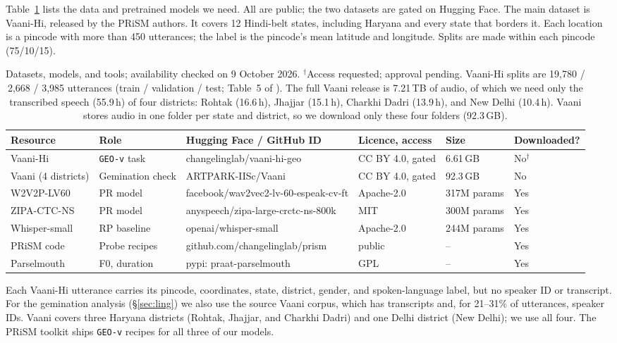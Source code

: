 \documentclass[11pt]{article}
\newcommand{\geov}{\texttt{GEO-v}}
\begin{document}
Table~\ref{tab:data} lists the data and pretrained models we need. All are public; the two datasets are gated on Hugging Face. The main dataset is Vaani-Hi, released by the PRiSM authors. It covers 12 Hindi-belt states, including Haryana and every state that borders it. Each location is a pincode with more than 450 utterances; the label is the pincode's mean latitude and longitude. Splits are made within each pincode (75/10/15).

\begin{table}[t]
\centering
\footnotesize
\setlength{\tabcolsep}{2.7pt}
\begin{tabular}{@{}ll>{\ttfamily\scriptsize}lll>{\centering\arraybackslash}p{1.15cm}@{}}
\toprule
\textbf{Resource} & \textbf{Role} & \normalfont\footnotesize\textbf{Hugging Face / GitHub ID} & \textbf{Licence, access} & \textbf{Size} & \textbf{Down\-loaded?} \\
\midrule
Vaani-Hi & \geov{} task & changelinglab/vaani-hi-geo & CC BY 4.0, gated & 6.61\,GB & No$^\dagger$ \\
Vaani (4 districts) & Gemination check & ARTPARK-IISc/Vaani & CC BY 4.0, gated & 92.3\,GB & No \\
W2V2P-LV60 & PR model & facebook/wav2vec2-lv-60-espeak-cv-ft & Apache-2.0 & 317M params & Yes \\
ZIPA-CTC-NS & PR model & anyspeech/zipa-large-crctc-ns-800k & MIT & 300M params & Yes \\
Whisper-small & RP baseline & openai/whisper-small & Apache-2.0 & 244M params & Yes \\
PRiSM code & Probe recipes & github.com/changelinglab/prism & public & -- & Yes \\
Parselmouth & F0, duration & pypi: praat-parselmouth & GPL & -- & Yes \\
\bottomrule
\end{tabular}
\caption{Datasets, models, and tools; availability checked on 9 October 2026. $^\dagger$Access requested; approval pending. Vaani-Hi splits are 19,780 / 2,668 / 3,985 utterances (train / validation / test; Table~5 of \citealp{bharadwaj2026prism}). The full Vaani release is 7.21\,TB of audio, of which we need only the transcribed speech (55.9\,h) of four districts: Rohtak (16.6\,h), Jhajjar (15.1\,h), Charkhi Dadri (13.9\,h), and New Delhi (10.4\,h). Vaani stores audio in one folder per state and district, so we download only these four folders (92.3\,GB).}
\label{tab:data}
\end{table}

Each Vaani-Hi utterance carries its pincode, coordinates, state, district, gender, and spoken-language label, but no speaker ID or transcript. For the gemination analysis (\S\ref{sec:ling}) we also use the source Vaani corpus, which has transcripts and, for 21--31\% of utterances, speaker IDs. Vaani covers three Haryana districts (Rohtak, Jhajjar, and Charkhi Dadri) and one Delhi district (New Delhi); we use all four. The PRiSM toolkit ships \geov{} recipes for all three of our models.
\end{document}
